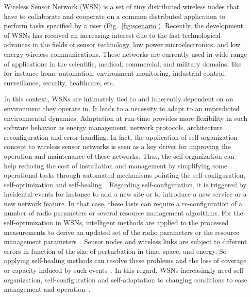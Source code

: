 Wireless Sensor Network (WSN) is a set of tiny distributed wireless nodes that have to collaborate and cooperate on a common distributed application to perform tasks specified by a user (Fig.~\ref{fig:scenario}). Recently, the development of WSNs has received an increasing interest due to the fast technological advances in the fields of sensor technology, low power microelectronics, and low energy wireless communications.
These networks are currently used in wide range of applications in the scientific, medical, commercial, and military domains, like for instance home automation, environment monitoring, industrial control, surveillance, security, healthcare, etc. 

In this context, WSNs are intimately tied to and inherently dependent on an environment they operate in. It leads to a necessity to adapt to an unpredicted environmental dynamics. Adaptation at run-time provides more flexibility in such software behavior as energy management, network protocols, architecture reconfiguration and error handling.
In fact, the application of self-organization concept to wireless sensor networks is seen as a key driver for improving the operation and maintenance of these networks. Thus, the self-organization can help reducing the cost of installation and management by simplifying some operational tasks through automated mechanisms pointing the self-configuration, self-optimization and self-healing~\cite{son_marchetti}.
Regarding self-configuration, it is triggered by incidental events for instance to add a new site or to introduce a new service or a new network feature. In that case, these lasts can require a re-configuration of a number of radio parameters or several resource management algorithms.
For the self-optimization in WSNs, intelligent methods are applied to the processed measurements to derive an updated set of the radio parameters or the resource management parameters~\cite{son_marchetti}.
Sensor nodes and wireless links are subject to different errors in function of the size of perturbation in time, space, and energy. So applying self-healing methods can resolve these problems and the loss of coverage or capacity induced by such events~\cite{son_marchetti}.
In this regard, WSNs increasingly need self-organization, self-configuration and self-adaptation to changing conditions to ease management and operation~\cite{son_sengul}.


